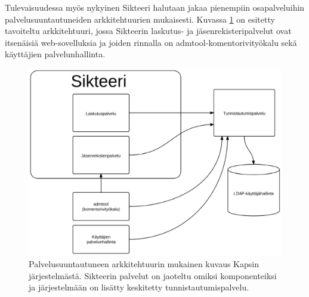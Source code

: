 Tulevaisuudessa myös nykyinen Sikteeri halutaan jakaa pienempiin osapalveluihin palvelusuuntautuneiden arkkitehtuurien mukaisesti. Kuvassa \ref{kapsi_uusi} on esitetty tavoiteltu arkkitehtuuri, jossa Sikteerin laskutus- ja jäsenrekisteripalvelut ovat itsenäisiä web-sovelluksia ja joiden rinnalla on admtool-komentorivityökalu sekä käyttäjien palvelunhallinta.

\begin{figure}[ht]
\centering
\includegraphics[width=.7\textwidth]{toteutus/kapsi_uusi.eps}
\caption{Palvelusuuntautuneen arkkitehtuurin mukainen kuvaus Kapsin järjestelmästä. Sikteerin palvelut on jaoteltu omiksi komponenteiksi ja järjestelmään on lisätty keskitetty tunnistautumispalvelu.}%
\label{kapsi_uusi}
\end{figure}